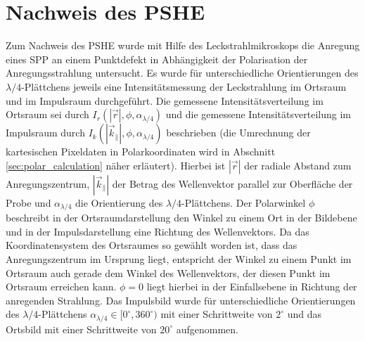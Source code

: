 \documentclass[a4paper, titlepage,  ngerman, fullpage]{book}
\begin{document}
	\section{Nachweis des PSHE}
	Zum Nachweis des PSHE wurde mit Hilfe des Leckstrahlmikroskops die Anregung eines SPP an einem Punktdefekt in Abhängigkeit der Polarisation der Anregungsstrahlung untersucht. Es wurde für unterschiedliche Orientierungen des $\lambda /4$-Plättchens jeweils eine Intensitätsmessung der Leckstrahlung im Ortsraum und im Impulsraum durchgeführt. Die gemessene Intensitätsverteilung im Ortsraum sei durch $I_r(|\vec{r}|, \phi, \alpha_{\lambda /4})$ und die gemessene Intensitätsverteilung im Impulsraum durch $I_k(|\vec{k}_\parallel|, \phi, \alpha_{\lambda /4})$ beschrieben (die Umrechnung der kartesischen Pixeldaten in Polarkoordinaten wird in Abschnitt \ref{sec:polar_calculation} näher erläutert). Hierbei ist $|\vec{r}|$ der radiale Abstand zum Anregungszentrum, $|\vec{k}_\parallel|$ der Betrag des Wellenvektor parallel zur Oberfläche der Probe und $\alpha_{\lambda/4}$ die Orientierung des $\lambda/4$-Plättchens. Der Polarwinkel $\phi$ beschreibt in der Ortsraumdarstellung den Winkel zu einem Ort in der Bildebene und in der Impulsdarstellung eine Richtung des Wellenvektors. Da das Koordinatensystem des Ortsraumes so gewählt worden ist, dass das Anregungszentrum im Ursprung liegt, entspricht der Winkel zu einem Punkt im Ortsraum auch gerade dem Winkel des Wellenvektors, der diesen Punkt im Ortsraum erreichen kann. $\phi = 0$ liegt hierbei in der Einfallsebene in Richtung der anregenden Strahlung. Das Impulsbild wurde für unterschiedliche Orientierungen des $\lambda/4$-Plättchens  $\alpha_{\lambda/4} \in [0^\circ,360^\circ)$ mit einer Schrittweite von $2^\circ$ und das Ortsbild mit einer Schrittweite von $20^\circ$ aufgenommen.
	
\end{document}
